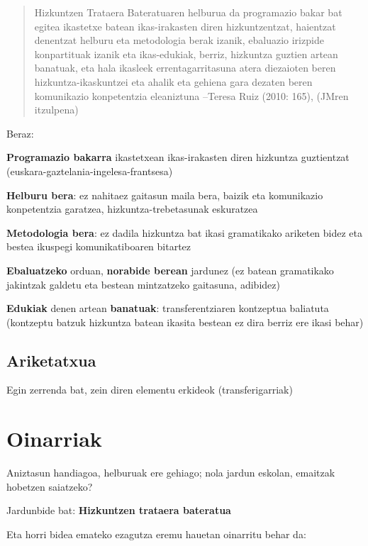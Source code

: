 \documentclass[
]{book}
\begin{document}
\begin{quote}
Hizkuntzen Trataera Bateratuaren helburua da programazio bakar bat egitea ikastetxe batean ikas-irakasten diren hizkuntzentzat, haientzat denentzat helburu eta metodologia berak izanik, ebaluazio irizpide konpartituak izanik eta ikas-edukiak, berriz, hizkuntza guztien artean banatuak, eta hala ikasleek errentagarritasuna atera diezaioten beren hizkuntza-ikaskuntzei eta ahalik eta gehiena gara dezaten beren komunikazio konpetentzia eleaniztuna
--Teresa Ruiz (2010: 165), (JMren itzulpena)
\end{quote}

Beraz:

\textbf{Programazio bakarra} ikastetxean ikas-irakasten diren hizkuntza guztientzat (euskara-gaztelania-ingelesa-frantsesa)

\textbf{Helburu bera}: ez nahitaez gaitasun maila bera, baizik eta komunikazio konpetentzia garatzea, hizkuntza-trebetasunak eskuratzea

\textbf{Metodologia bera}: ez dadila hizkuntza bat ikasi gramatikako ariketen bidez eta bestea ikuspegi komunikatiboaren bitartez

\textbf{Ebaluatzeko} orduan, \textbf{norabide berean} jardunez (ez batean gramatikako jakintzak galdetu eta bestean mintzatzeko gaitasuna, adibidez)

\textbf{Edukiak} denen artean \textbf{banatuak}: transferentziaren kontzeptua baliatuta (kontzeptu batzuk hizkuntza batean ikasita bestean ez dira berriz ere ikasi behar)

\hypertarget{ariketatxua}{%
\subsection*{Ariketatxua}\label{ariketatxua}}

Egin zerrenda bat, zein diren elementu erkideok (transferigarriak)

\hypertarget{oinarriak}{%
\section{Oinarriak}\label{oinarriak}}

Aniztasun handiagoa, helburuak ere gehiago; nola jardun eskolan, emaitzak hobetzen saiatzeko?

Jardunbide bat: \textbf{Hizkuntzen trataera bateratua}

Eta horri bidea emateko ezagutza eremu hauetan oinarritu behar da:
\end{document}
